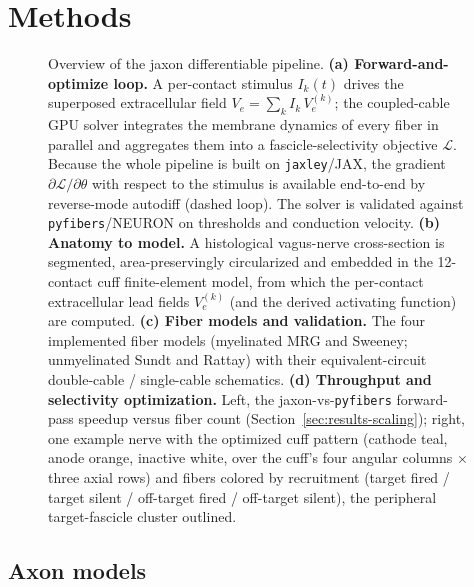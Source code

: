 \section{Methods}
\label{sec:methods}

\begin{figure}[h]
  \centering
  \caption{Overview of the jaxon differentiable pipeline.
    \textbf{(a) Forward-and-optimize loop.}  A per-contact
    stimulus $I_k(t)$ drives the superposed extracellular field
    $V_e = \sum_k I_k\,V_e^{(k)}$; the coupled-cable GPU solver
    integrates the membrane dynamics of every fiber in parallel and
    aggregates them into a fascicle-selectivity objective
    $\mathcal{L}$.  Because the whole pipeline is built on
    \texttt{jaxley}/JAX, the gradient
    $\partial\mathcal{L}/\partial\theta$ with respect to the stimulus
    is available end-to-end by reverse-mode autodiff (dashed loop).
    The solver is validated against \texttt{pyfibers}/NEURON on
    thresholds and conduction velocity.
    \textbf{(b) Anatomy to model.}  A histological vagus-nerve
    cross-section is segmented, area-preservingly circularized and
    embedded in the 12-contact cuff finite-element model, from which the
    per-contact extracellular lead fields $V_e^{(k)}$ (and the derived
    activating function) are computed.
    \textbf{(c) Fiber models and validation.}  The four
    implemented fiber models (myelinated MRG and Sweeney; unmyelinated
    Sundt and Rattay) with their equivalent-circuit double-cable /
    single-cable schematics.
    \textbf{(d) Throughput and selectivity optimization.}
    Left, the jaxon-vs-\texttt{pyfibers} forward-pass speedup versus
    fiber count (Section~\ref{sec:results-scaling}); right, one example
    nerve with the optimized cuff pattern (cathode teal, anode orange,
    inactive white, over the cuff's four angular columns $\times$ three
    axial rows) and fibers colored by recruitment (target fired / target
    silent / off-target fired / off-target silent), the peripheral
    target-fascicle cluster outlined.}
  \label{fig:overview}
\end{figure}

\subsection{Axon models}
\label{sec:methods-models}


